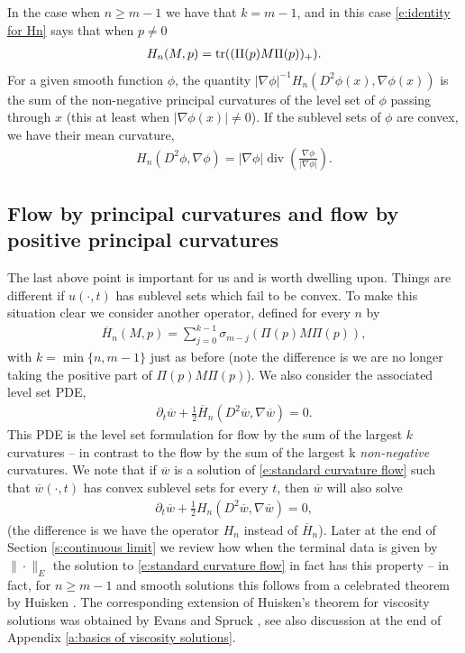 \documentclass[reqno]{amsart}
\numberwithin{equation}{section}
\DeclareMathOperator{\tr}{\mathrm\mathrm{tr}}
\DeclareMathOperator{\dv}{\mathrm{div}}
\begin{document}
  In the case when $n\geq m-1$ we have that $k= m-1$, and in this case \eqref{e:identity for Hn} says that when $p\neq 0$
  \begin{align*}
    H_n(M,p) = \tr((\Pi(p)M\Pi(p))_+).
  \end{align*}
  For a given smooth function $\phi$, the quantity $|\nabla \phi|^{-1}H_n(D^2\phi(x),\nabla \phi(x))$ is the sum of the non-negative principal curvatures of the level set of $\phi$ passing through $x$ (this at least when $|\nabla \phi(x)|\neq 0$). If the sublevel sets of $\phi$ are convex, we have their mean curvature, 
  \begin{align*}
    H_n(D^2\phi,\nabla \phi) = |\nabla \phi| \dv\left (\frac{\nabla \phi}{|\nabla \phi|}\right ).
  \end{align*}
  \subsection{Flow by principal curvatures and flow by positive principal curvatures}\label{s:positive curvatures versus curvatures} The last above point is important for us and is worth dwelling upon. Things are different if $u(\cdot,t)$ has sublevel sets which fail to be convex. To make this situation clear we consider another operator, defined for every $n$ by 
  \begin{align*}
\overline H_n(M,p) = \sum\limits_{j=0}^{k-1}\sigma_{m-j}(\Pi(p)M\Pi(p)),
\end{align*}
  with $k = \min\{n,m-1\}$ just as before (note the difference is we are no longer taking the positive part of $\Pi(p)M\Pi(p)$). We also consider the associated level set PDE,
  \begin{align}\label{e:standard curvature flow}
    \partial_t \overline w + \tfrac{1}{2}\overline H_n(D^2\overline w,\nabla \overline w) = 0.
  \end{align}
  This PDE is the level set formulation for flow by the sum of the largest $k$ curvatures --  in contrast to the flow by the sum of the largest k \emph{non-negative} curvatures.  We note that if $\overline w$ is a solution of \eqref{e:standard curvature flow}  such that $\overline w(\cdot,t)$ has convex sublevel sets for every $t$, then $\overline w$ will also solve  
    \begin{align*}
    \partial_t \overline w + \tfrac{1}{2} H_n(D^2\overline w,\nabla \overline w) = 0,
  \end{align*}
  (the difference is we have the operator $H_n$ instead of $\overline H_n$).  Later at the end of Section \ref{s:continuous limit} we review how when the terminal data is given by $\|\cdot\|_E$ the solution to \eqref{e:standard curvature flow} in fact has this property -- in fact, for $n\geq m-1$ and smooth solutions this follows from a celebrated theorem by Huisken \cite{Huisken1984}. The corresponding extension of Huisken's theorem for viscosity solutions was obtained by Evans and Spruck \cite{EvansSpruck1991}, see also discussion at the end of Appendix \ref{a:basics of viscosity solutions}.
\end{document}
